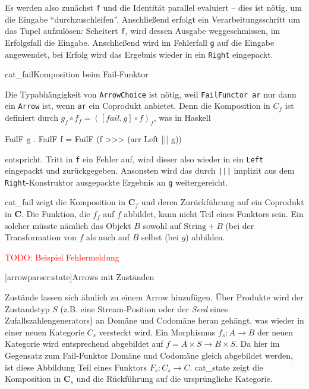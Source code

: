 \documentclass[12pt, a4paper, bibgerm]{scrbook}
\newenvironment{DIFnomarkup}{}{}
\newcommand\icode[1]{\lstinline?#1?}
\newcommand{\todo}[1]{
  \textcolor{red}{TODO: #1}
}
\newcommand\lsection{}
\newcommand\abb{}
\newcommand\fig{}
\newcommand\ato{\rightarrow} %
\begin{document}
Es werden also zunächst \icode{f} und die Identität parallel evaluiert --
dies ist nötig, um die Eingabe "`durchzuschleifen"'. Anschließend
erfolgt ein Verarbeitungsschritt um das Tupel aufzulösen: Scheitert
\icode{f}, wird dessen Ausgabe weggeschmissen, im Erfolgsfall die
Eingabe. Anschließend wird im Fehlerfall \icode{g} auf die Eingabe
angewendet, bei Erfolg wird das Ergebnis wieder in ein \icode{Right} eingepackt.

\fig{cat_fail}{Komposition beim Fail-Funktor}

Die Typabhängigkeit von \icode{ArrowChoice} ist nötig, weil
\icode{FailFunctor ar} nur dann ein \icode{Arrow} ist, wenn \icode{ar}
ein Coprodukt anbietet. Denn die Komposition in $C_{f}$ ist definiert
durch $g_{f} \circ f_{f} = ([fail,g] \circ f)_{f}$, was in Haskell
\begin{DIFnomarkup}\begin{code}
FailF g . FailF f = FailF (f >>> (arr Left ||| g))
\end{code}\end{DIFnomarkup} %
entspricht. Tritt in \icode{f} ein Fehler auf, wird dieser also wieder
in ein \icode{Left} eingepackt und zurückgegeben. Ansonsten wird das
durch \icode{|||} implizit aus dem \icode{Right}-Konstruktor ausgepackte
Ergebnis an \icode{g} weitergereicht.

\abb{cat_fail} zeigt die Komposition in $\mathbf{C}_f$ und deren
Zurückführung auf ein Coprodukt in $\mathbf{C}$. Die Funktion, die $f_f$
auf $f$ abbildet, kann nicht Teil eines Funktors sein. Ein solcher
müsste nämlich das Objekt $B$ sowohl auf $\mathrm{String}+B$ (bei der
Transformation von $f$ als auch auf $B$ selbst (bei $g$) abbilden.

\todo{Beispiel Fehlermeldung}

\lsection[arrowparser:state]{Arrows mit Zuständen}

Zustände lassen sich ähnlich zu einem Arrow hinzufügen. Über Produkte
wird der Zustandstyp $S$ (z.B. eine Stream-Position oder der
\textit{Seed} eines Zufallszahlengenerators) an Domäne und Codomäne
heran gehängt, was wieder in einer neuen Kategorie $C_{s}$ versteckt
wird. Ein Morphismus $f_{s} : A \rightarrow B$ der neuen Kategorie
wird entsprechend abgebildet auf $f = A \times S \rightarrow B \times
S$. Da hier im Gegensatz zum Fail-Funktor Domäne und Codomäne gleich
abgebildet werden, ist diese Abbildung Teil eines Funktors $F_s: C_{s}
\ato C$. \abb{cat_state} zeigt die Komposition in $\mathbf{C}_s$ und die
Rückführung auf die ursprüngliche Kategorie.
\end{document}
